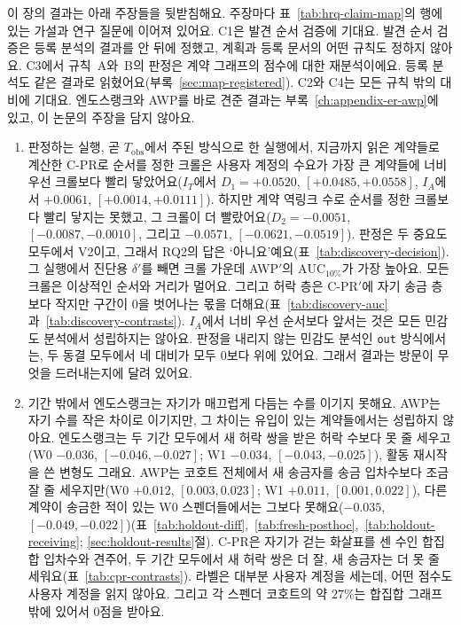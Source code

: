 이 장의 결과는 아래 주장들을 뒷받침해요. 주장마다 표~\ref{tab:hrq-claim-map}의 행에 있는 가설과 연구 질문에 이어져 있어요. C1은 발견 순서 검증에 기대요. 발견 순서 검증은 등록 분석의 결과를 안 뒤에 정했고, 계획과 등록 문서의 어떤 규칙도 정하지 않아요. C3에서 규칙~A와~B의 판정은 계약 그래프의 점수에 대한 재분석이에요. 등록 분석도 같은 결과로 읽혔어요(부록~\ref{sec:map-registered}). C2와 C4는 모든 규칙 밖의 대비에 기대요. 엔도스랭크와 AWP를 바로 견준 결과는 부록~\ref{ch:appendix-er-awp}에 있고, 이 논문의 주장을 담지 않아요.

\begin{enumerate}
\item[C1.] 판정하는 실행, 곧 $T_{\mathrm{obs}}$에서 주된 방식으로 한 실행에서, 지금까지 읽은 계약들로 계산한 \mbox{C-PR}로 순서를 정한 크롤은 사용자 계정의 수요가 가장 큰 계약들에 너비 우선 크롤보다 빨리 닿았어요($I_T$에서 $D_1=+0.0520$, $[+0.0485,+0.0558]$, $I_A$에서 $+0.0061$, $[+0.0014,+0.0111]$). 하지만 계약 역링크 수로 순서를 정한 크롤보다 빨리 닿지는 못했고, 그 크롤이 더 빨랐어요($D_2=-0.0051$, $[-0.0087,-0.0010]$, 그리고 $-0.0571$, $[-0.0621,-0.0519]$). 판정은 두 중요도 모두에서 V2이고, 그래서 RQ2의 답은 ‘아니요’예요(표~\ref{tab:discovery-decision}). 그 실행에서 진단용 $\delta'$를 빼면 크롤 가운데 AWP$'$의 $\mathrm{AUC}_{10\%}$가 가장 높아요. 모든 크롤은 이상적인 순서와 거리가 멀어요. 그리고 허락 층은 \mbox{C-PR}$'$에 자기 송금 층보다 작지만 구간이 0을 벗어나는 몫을 더해요(표~\ref{tab:discovery-auc}과~\ref{tab:discovery-contrasts}). $I_A$에서 너비 우선 순서보다 앞서는 것은 모든 민감도 분석에서 성립하지는 않아요. 판정을 내리지 않는 민감도 분석인 \texttt{out} 방식에서는, 두 동결 모두에서 네 대비가 모두 0보다 위에 있어요. 그래서 결과는 방문이 무엇을 드러내는지에 달려 있어요.
\item[C2.] 기간 밖에서 엔도스랭크는 자기가 매끄럽게 다듬는 수를 이기지 못해요. AWP는 자기 수를 작은 차이로 이기지만, 그 차이는 유입이 있는 계약들에서는 성립하지 않아요. 엔도스랭크는 두 기간 모두에서 새 허락 쌍을 받은 허락 수보다 못 줄 세우고(W0 $-0.036$, $[-0.046,-0.027]$; W1 $-0.034$, $[-0.043,-0.025]$), 활동 재시작을 쓴 변형도 그래요. AWP는 코호트 전체에서 새 송금자를 송금 입차수보다 조금 잘 줄 세우지만(W0 $+0.012$, $[0.003,0.023]$; W1 $+0.011$, $[0.001,0.022]$), 다른 계약이 송금한 적이 있는 W0 스펜더들에서는 그보다 못해요($-0.035$, $[-0.049,-0.022]$)(표~\ref{tab:holdout-diff},~\ref{tab:fresh-posthoc},~\ref{tab:holdout-receiving}; \ref{sec:holdout-results}절). \mbox{C-PR}은 자기가 걷는 화살표를 센 수인 합집합 입차수와 견주어, 두 기간 모두에서 새 허락 쌍은 더 잘, 새 송금자는 더 못 줄 세워요(표~\ref{tab:cpr-contrasts}). 라벨은 대부분 사용자 계정을 세는데, 어떤 점수도 사용자 계정을 읽지 않아요. 그리고 각 스펜더 코호트의 약 $27\%$는 합집합 그래프 밖에 있어서 0점을 받아요.

\end{enumerate}
